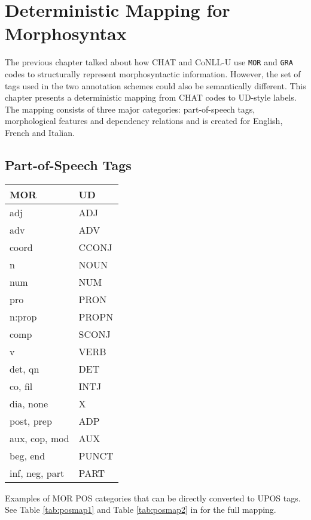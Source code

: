 \chapter{Deterministic Mapping for Morphosyntax} %
\label{Chapter4}

The previous chapter talked about how CHAT and CoNLL-U use \texttt{MOR} and \texttt{GRA} codes to structurally represent morphosyntactic information. However, the set of tags used in the two annotation schemes could also be semantically different. This chapter presents a deterministic mapping from CHAT codes to UD-style labels. The mapping consists of three major categories: part-of-speech tags, morphological features and dependency relations and is created for English, French and Italian.

\section{Part-of-Speech Tags}
\label{sec:pos}
\begin{margintable}[1\baselineskip] %
\begin{tabularx}{\textwidth}{@{}Ll@{}}
\toprule
\textbf{MOR} & \textbf{UD}\\ \midrule
adj & ADJ\\
adv & ADV\\
coord & CCONJ\\
n & NOUN\\
num & NUM\\
pro & PRON\\
n:prop & PROPN\\
comp & SCONJ\\
v & VERB\\
det, qn & DET\\
co, fil & INTJ\\
dia, none & X\\
post, prep & ADP\\
aux, cop, mod & AUX\\
beg, end & PUNCT\\
inf, neg, part & PART\\\bottomrule
\end{tabularx}
\caption{\label{tab:martabpos}Examples of MOR POS categories that can be directly converted to UPOS tags. See Table \ref{tab:posmap1} and Table \ref{tab:posmap2} in  for the full mapping.}
\footnotesize
\end{margintable}



